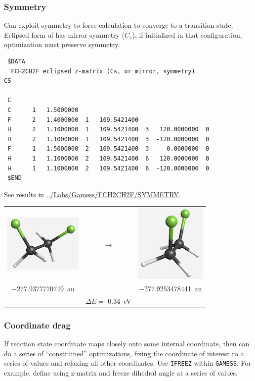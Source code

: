 \documentclass[11pt]{article}
\begin{document}
\subsubsection{Symmetry}
\label{sec:orgc927188}
Can exploit symmetry to force calculation to converge to a transition state. Eclipsed form of  has mirror symmetry (\(C_s\)), if initialized in that configuration, optimization must preserve symmetry.  

\begin{verbatim}
 $DATA
  FCH2CH2F eclipsed z-matrix (Cs, or mirror, symmetry)
CS

 C   
 C      1   1.5000000
 F      2   1.4000000  1   109.5421400
 H      2   1.1000000  1   109.5421400  3   120.0000000  0
 H      2   1.1000000  1   109.5421400  3  -120.0000000  0
 F      1   1.5000000  2   109.5421400  3     0.0000000  0
 H      1   1.1000000  2   109.5421400  6   120.0000000  0
 H      1   1.1000000  2   109.5421400  6  -120.0000000  0
 $END
\end{verbatim}

See results in \url{../Labs/Gamess/FCH2CH2F/SYMMETRY}.

\begin{center}
\begin{tabular}{ccc}
\includegraphics{./Images/FCH2CH2F-gauche.png}
 & \(\longrightarrow\) & 
\includegraphics{./Images/FCH2CH2F-eclipsed.png} \\
\SI{-277.9377770749}{au} &  & \SI{-277.9253478441}{au} \\
  &  \(\Delta E =\) \SI{0.34}{eV} &  \\
\end{tabular}
\end{center}

\subsubsection{Coordinate drag}
\label{sec:org15adf7d}
If reaction state coordinate maps closely onto some internal coordinate, then can do a series of ``constrained'' optimizations, fixing the coordinate of interest to a series of values and relaxing all other coordinates.  Use \texttt{IFREEZ} within \texttt{GAMESS}.  For example, define  using z-matrix and freeze  dihedral angle at a series of values.
\end{document}

